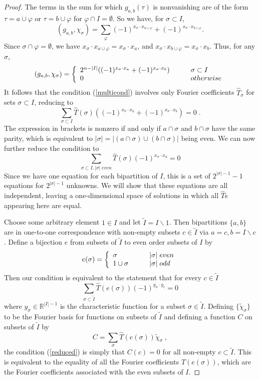 \documentclass[10pt,a4paper]{amsart}
\theoremstyle{definition}
\begin{document}
\begin{proof}
The terms in the sum for which $g_{a,b}(\tau)$ is nonvanishing are of the form $\tau = a \cup \varphi$ or $\tau = b \cup \varphi$ for $\varphi \cap I = \emptyset$. So we have, for $\sigma \subset I$,
\[
(g_{a,b}, \chi_\sigma) = \sum_\varphi (-1)^{x_\sigma \cdot x_{a \cup \varphi}} + (-1)^{x_\sigma \cdot x_{b \cup \varphi}} .
\]
Since $\sigma \cap \varphi = \emptyset$, we have $x_\sigma \cdot x_{a \cup \varphi} = x_\sigma \cdot x_{a}$, and $x_\sigma \cdot x_{b \cup \varphi} = x_\sigma \cdot x_{b}$. Thus, for any $\sigma$,
\[
(g_{a,b}, \chi_\sigma) =  \left\{ \begin{array}{ll} 2^{n-|I|} ((-1)^{x_\sigma \cdot x_a} + (-1)^{x_\sigma \cdot x_b}) &  \qquad \sigma \subset I \cr
0 & \qquad {\rm otherwise} \end{array}  \right.
\]
It follows that the condition (\ref{multicond}) involves only Fourier coefficients $\hat{T}_\sigma$ for sets $\sigma \subset I$, reducing to 
\begin{equation}
\label{multicond2}
\sum_{\sigma \subset I} \hat{T}(\sigma) ((-1)^{x_\sigma \cdot x_a} + (-1)^{x_\sigma \cdot x_b}) = 0 \; .
\end{equation}
The expression in brackets is nonzero if and only if $a \cap \sigma$ and $b \cap \sigma$ have the same parity, which is equivalent to $|\sigma| = |(a \cap \sigma) \cup (b \cap \sigma)|$ being even. We can now further reduce the condition to
\[
\sum_{\sigma \subset I, |\sigma| \; even}  \hat{T}(\sigma) (-1)^{x_\sigma \cdot x_a} = 0
\]
Since we have one equation for each bipartition of $I$, this is a set of $2^{|\sigma|-1}-1$ equations for $2^{|\sigma|-1}$ unknowns. We will show that these equations are all independent, leaving a one-dimensional space of solutions in which all $\hat{T}$s appearing here are equal. 

Choose some arbitrary element $1 \in I$ and let $\tilde{I} = I \backslash 1$. Then bipartitions $\{a,b\}$ are in one-to-one correspondence with non-empty subsets $c \in \tilde{I}$ via $a= c, b = I \backslash c$. Define a bijection $e$ from subsets of $\tilde{I}$ to even order subsets of $I$ by 
\[
e(\sigma) = \left\{ \begin{array}{ll} \sigma & \qquad |\sigma| \; even \cr
{1} \cup \sigma & \qquad |\sigma| \; odd \cr
\end{array}
\right.
\]
Then our condition is equivalent to the statement that for every $c \in \tilde{I}$
\begin{equation}
\label{reduced}
\sum_{\sigma \subset \tilde{I}} \hat{T}(e(\sigma)) (-1)^{y_\sigma \cdot y_c} = 0
\end{equation}
where $y_\sigma \in \mathbb{R}^{|I| - 1}$ is the characteristic function for a subset $\sigma \in \tilde{I}$. Defining $\{\tilde{\chi}_\sigma\}$ to be the Fourier basis for functions on subsets of $\tilde{I}$ and defining a function $C$ on subsets of $\tilde{I}$ by
\[
C = \sum_\sigma \hat{T}(e(\sigma)) \tilde{\chi}_\sigma \; ,
\]
the condition (\ref{reduced}) is simply that $C(c) = 0$ for all non-empty $c \subset \tilde{I}$. This is equivalent to the equality of all the Fourier coefficients $\hat{T}(e(\sigma))$, which are the Fourier coefficients associated with the even subsets of $I$. 
\end{proof}
\end{document}
